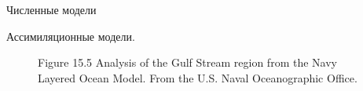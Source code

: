 \begin{chapter}{Численные модели}
\begin{section}{Ассимиляционные модели.}
\begin{figure}[h!]
\begin{centering}
\end{centering}
\caption{Figure 15.5 Analysis of the Gulf Stream region from the Navy Layered Ocean Model.
From the U.S. Naval Oceanographic Office.}
\label{fig:nlom-gulfstream}
\end{figure}
%
%

\end{section}


\end{chapter}

